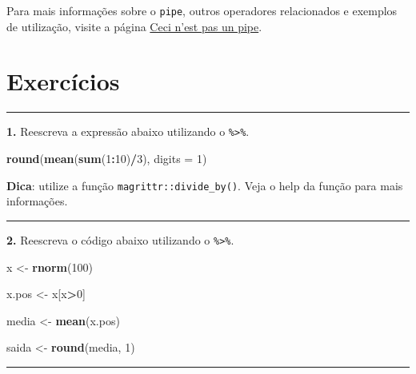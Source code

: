 \documentclass[
]{book}
\newenvironment{Shaded}{\begin{snugshade}}{\end{snugshade}}
\newcommand{\DataTypeTok}[1]{\textcolor[rgb]{0.13,0.29,0.53}{#1}}
\newcommand{\DecValTok}[1]{\textcolor[rgb]{0.00,0.00,0.81}{#1}}
\newcommand{\KeywordTok}[1]{\textcolor[rgb]{0.13,0.29,0.53}{\textbf{#1}}}
\newcommand{\NormalTok}[1]{#1}
\newcommand{\OperatorTok}[1]{\textcolor[rgb]{0.81,0.36,0.00}{\textbf{#1}}}
\newcommand{\StringTok}[1]{\textcolor[rgb]{0.31,0.60,0.02}{#1}}
\begin{document}
Para mais informações sobre o \texttt{pipe}, outros operadores relacionados e exemplos de utilização, visite a página \href{http://cran.r-project.org/web/packages/magrittr/vignettes/magrittr.html}{Ceci n'est pas un pipe}.

\hypertarget{exercuxedcios-1}{%
\section{Exercícios}\label{exercuxedcios-1}}

\begin{center}\rule{0.5\linewidth}{0.5pt}\end{center}

\textbf{1.} Reescreva a expressão abaixo utilizando o \texttt{\%\textgreater{}\%}.

\begin{Shaded}
\begin{Highlighting}[]
\KeywordTok{round}\NormalTok{(}\KeywordTok{mean}\NormalTok{(}\KeywordTok{sum}\NormalTok{(}\DecValTok{1}\OperatorTok{:}\DecValTok{10}\NormalTok{)}\OperatorTok{/}\DecValTok{3}\NormalTok{), }\DataTypeTok{digits =} \DecValTok{1}\NormalTok{)}
\end{Highlighting}
\end{Shaded}

\textbf{Dica}: utilize a função \texttt{magrittr::divide\_by()}. Veja o help da função para mais informações.

\begin{center}\rule{0.5\linewidth}{0.5pt}\end{center}

\textbf{2.} Reescreva o código abaixo utilizando o \texttt{\%\textgreater{}\%}.

\begin{Shaded}
\begin{Highlighting}[]

\NormalTok{x <-}\StringTok{ }\KeywordTok{rnorm}\NormalTok{(}\DecValTok{100}\NormalTok{)}

\NormalTok{x.pos <-}\StringTok{ }\NormalTok{x[x}\OperatorTok{>}\DecValTok{0}\NormalTok{]}

\NormalTok{media <-}\StringTok{ }\KeywordTok{mean}\NormalTok{(x.pos)}

\NormalTok{saida <-}\StringTok{ }\KeywordTok{round}\NormalTok{(media, }\DecValTok{1}\NormalTok{)}
\end{Highlighting}
\end{Shaded}

\begin{center}\rule{0.5\linewidth}{0.5pt}\end{center}
\end{document}
